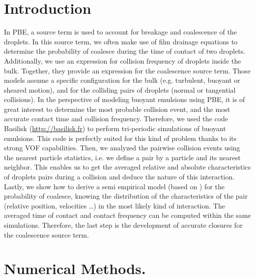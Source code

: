 \documentclass[twocolumn,a4paper,10pt]{scrartcl}
\begin{document}
\section*{Introduction}
In PBE, a source term is used to account for breakage and coalescence of the droplets. 
In this source term, we often make use of film drainage equations to determine the probability of coalesce during the time of contact of two droplets.
Additionally, we use an expression for collision frequency of droplets inside the bulk.
Together, they provide an expression for the coalescence source term. 
Those models assume a specific configuration for the bulk (e.g. turbulent, buoyant or sheared motion), and for the colliding pairs of droplets (normal or tangential collisions).
In the perspective of modeling buoyant emulsions using PBE, it is of great interest to determine the most probable collision event, and the most accurate contact time and collision frequency. 
Therefore, we used the code Basilisk (\url{http://basilisk.fr}) to perform tri-periodic simulations of buoyant emulsions. 
This code is perfectly suited for this kind of problem thanks to its strong VOF capabilities. 
Then, we analyzed the pairwise collision events using the nearest particle statistics, i.e. we define a pair by a particle and its nearest neighbor. 
This enables us to get the averaged relative and absolute characteristics of droplets pairs during a collision and deduce the nature of this interaction.  
Lastly, we show how to derive a semi empirical model (based on \citet{chesters1991modelling}) for the probability of coalesce, knowing the distribution of the characteristics of the pair (relative position, velocities \ldots) in the most likely kind of interaction. 
The averaged time of contact and contact frequency can be computed within the same simulations. 
Therefore, the last step is the development of accurate closures for the coalescence source term. 

\section*{Numerical Methods.}
\end{document}
